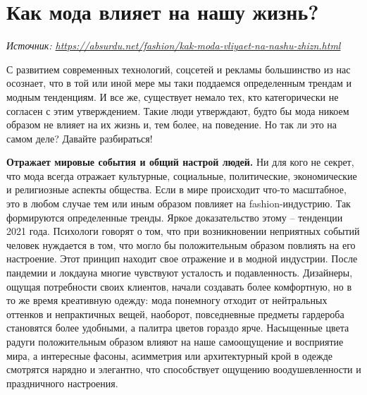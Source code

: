 
\section{Как мода влияет на нашу жизнь?}

\textit{Источник: \url{https://absurdu.net/fashion/kak-moda-vliyaet-na-nashu-zhizn.html}}

С развитием современных технологий, соцсетей и рекламы большинство из нас осознает, что в той или иной мере мы таки поддаемся определенным трендам и модным тенденциям. И все же, существует немало тех, кто категорически не согласен с этим утверждением. Такие люди утверждают, будто бы мода никоем образом не влияет на их жизнь и, тем более, на поведение. Но так ли это на самом деле? Давайте разбираться!

\textbf{Отражает мировые события и общий настрой людей.}
Ни для кого не секрет, что мода всегда отражает культурные, социальные, политические, экономические и религиозные аспекты общества. Если в мире происходит что-то масштабное, это в любом случае тем или иным образом повлияет на fashion-индустрию. Так формируются определенные тренды. Яркое доказательство этому – тенденции 2021 года. Психологи говорят о том, что при возникновении неприятных событий человек нуждается в том, что могло бы положительным образом повлиять на его настроение. Этот принцип находит свое отражение и в модной индустрии. После пандемии и локдауна многие чувствуют усталость и подавленность. Дизайнеры, ощущая потребности своих клиентов, начали создавать более комфортную, но в то же время креативную одежду: мода понемногу отходит от нейтральных оттенков и непрактичных вещей, наоборот, повседневные предметы гардероба становятся более удобными, а палитра цветов гораздо ярче. Насыщенные цвета радуги положительным образом влияют на наше самоощущение и восприятие мира, а интересные фасоны, асимметрия или архитектурный крой в одежде смотрятся нарядно и элегантно, что способствует ощущению воодушевленности и праздничного настроения.

